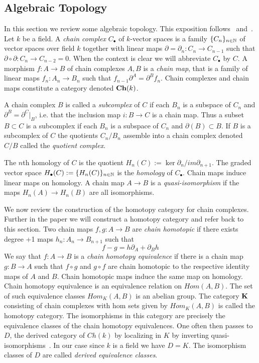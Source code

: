 \subsection{Algebraic Topology}\label{sec:prelims:AT}

In this section we review some algebraic topology.  This exposition follows~\cite{weibel} and~\cite{gelfand}.  Let $k$ be a field.  A {\em chain complex} $C_\bullet$ of $k$-vector spaces is a family $\{C_n\}_{n\in {\mathbb{N}}}$ of vector spaces over field $k$ together with linear maps $\partial=\partial_n:C_n\to C_{n-1}$ such that $\partial\circ\partial: C_n\to C_{n-2}=0$.  When the context is clear we will abbreviate $C_\bullet$ by $C$.  A morphism $f:A\to B$ of chain complexes $A,B$ is a {\em chain map}, that is a family of linear maps $f_n:A_n\to B_n$ such that $f_{n-1}\partial^A = \partial^B f_n$. Chain complexes and chain maps constitute a category denoted ${\bf Ch}(k)$.  

A chain complex $B$ is called a {\em subcomplex} of $C$ if each $B_n$ is a subspace of $C_n$ and $\partial^B= \partial^C|_B$, i.e. that the inclusion map $i:B\to C$ is a chain map.  Thus a subset $B\subset C$ is a subcomplex if each $B_n$ is a subspace of $C_n$ and $\partial( B)\subset B$.  If $B$ is a subcomplex of $C$ the quotients $C_n/B_n$ assemble into a chain complex denoted $C/B$ called the {\em quotient complex}.   

 The $n$th homology of $C$ is the quotient $H_n(C):= \ker \partial_n/im \partial_{n+1}$.  The graded vector space $H_\bullet(C) := \{H_n(C)\}_{n\in {\mathbb{N}}}$ is the {\em homology} of $C_\bullet$.  Chain maps induce linear maps on homology.  A chain map $A\to B$ is a {\em quasi-isomorphism} if the maps $H_n(A)\to H_n(B)$ are all isomorphisms.

We now review the construction of the homotopy category for chain complexes.  Further in the paper we will construct a homotopy category and refer back to this section.  Two chain maps $f,g:A\to B$ are {\em chain homotopic} if there exists degree +1 maps $h_n:A_n\to B_{n+1}$ such that $$f-g = h\partial_A+\partial_Bh$$  We say that $f:A\to B$ is a {\em chain homotopy equivalence} if there is a chain map $g:B\to A$ such that $f\circ g$ and $g\circ f$ are chain homotopic to the respective identity maps of $A$ and $B$. Chain homotopic maps induce the same map on homology.   Chain homotopy equivalence is an equivalence relation on $Hom(A,B)$.  The set of such equivalence classes $Hom_K(A,B)$ is an abelian group.  The category ${\bf K}$ consisting of chain complexes with hom sets given by $Hom_K(A,B)$ is called the homotopy category.  The isomorphisms in this category are precisely the equivalence classes of the chain homotopy equivalences.  One often then passes to $D$, the derived category of $Ch(k)$ by localizing in $K$ by inverting quasi-isomorphisms~\cite[Chapter 10]{weibel}.  In our case since $k$ is a field we have $D=K$.  The isomorphism classes of $D$ are called {\em derived equivalence classes}.

